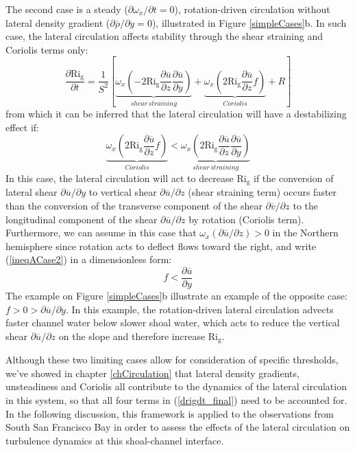 The second case is a steady ($\partial \omega_x / \partial t = 0$), rotation-driven circulation without lateral density gradient ($\partial \overline{\rho} / \partial y = 0$), illustrated in Figure \ref{simpleCases}b. In such case, the lateral circulation affects stability through the shear straining and Coriolis terms only:
\begin{equation}
\frac{\partial \mathrm{Ri_g}}{\partial t}=\frac{1}{S^{2}}\left[\underbrace{\omega_{x}\left(-2\mathrm{Ri_g}\frac{\partial \overline{u}}{\partial z}\frac{\partial \overline{u}}{\partial y}\right)}_{shear\, straining}+\underbrace{\omega_{x}\left(2\mathrm{Ri_g}\frac{\partial \overline{u}}{\partial z}f\right)}_{Coriolis}+R\right]
\label{drigdt_case2}
\end{equation}
from which it can be inferred that the lateral circulation will have a destabilizing effect if:
\begin{equation}
\underbrace{\omega_{x}\left(2\mathrm{Ri_g}\frac{\partial \overline{u}}{\partial z}f\right)}_{Coriolis} < \underbrace{\omega_{x}\left(2\mathrm{Ri_g}\frac{\partial \overline{u}}{\partial z}\frac{\partial \overline{u}}{\partial y}\right)}_{shear\, straining}
\label{ineqACase2}
\end{equation}
In this case, the lateral circulation will act to decrease $\mathrm{Ri_g}$ if the conversion of lateral shear $\partial \overline{u} / \partial y$ to vertical shear $\partial \overline{u} / \partial z$ (shear straining term) occurs faster than the conversion of the transverse component of the shear  $\partial \overline{v} / \partial z$ to the longitudinal component of the shear  $\partial \overline{u} / \partial z$ by rotation (Coriolis term). Furthermore, we can assume in this case that $\omega_x (\partial \overline{u} / \partial z) > 0$ in the Northern hemisphere since rotation acts to deflect flows toward the right, and write (\ref{ineqACase2}) in a dimensionless form:
\begin{equation}
f < \frac{\partial \overline{u}}{\partial y}
\label{ineqBCase2}
\end{equation}
The example on Figure \ref{simpleCases}b illustrate an example of the opposite case: $f > 0 > \partial \overline{u} / \partial y$. In this example, the rotation-driven lateral circulation advects faster channel water below slower shoal water, which acts to reduce the vertical shear $\partial \overline{u} / \partial z$ on the slope and therefore increase $\mathrm{Ri_g}$.

Although these two limiting cases allow for consideration of specific thresholds, we've showed in chapter \ref{chCirculation} that lateral density gradients, unsteadiness and Coriolis all contribute to the dynamics of the lateral circulation in this system, so that all four terms in (\ref{drigdt_final}) need to be accounted for. In the following discussion, this framework is applied to the observations from South San Francisco Bay in order to assess the effects of the lateral circulation on turbulence dynamics at this shoal-channel interface.


